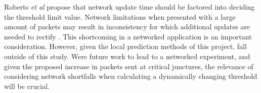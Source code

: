 \documentclass[journal]{IEEEtran}
\begin{document}
Roberts \textit{et al} propose that network update time should be factored into deciding the threshold limit value. Network limitations when presented with a large amount of packets may result in inconsistency for which additional updates are needed to rectify \cite{roberts2008bounding}. This shortcoming in a networked application is an important consideration. However, given the local prediction methods of this project, fall outside of this study. Were future work to lead to a networked experiment, and given the proposed increase in packets sent at critical junctures, the relevance of considering network shortfalls when calculating a dynamically changing threshold will be crucial.


\end{document}

